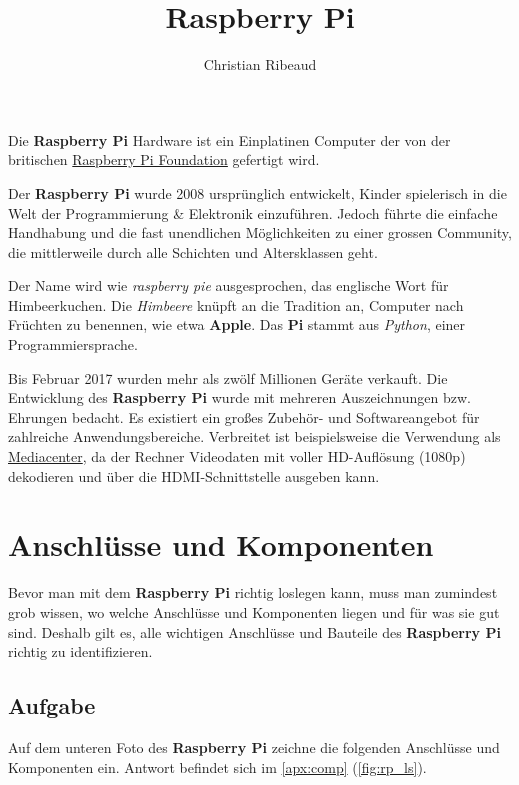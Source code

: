 \documentclass[12pt,a4paper]{article}
\newcommand{\rp}{\textbf{Raspberry Pi}\xspace}
\begin{document}
\title{Raspberry Pi}
\author{Christian Ribeaud}
\maketitle

Die \rp Hardware ist ein Einplatinen Computer der von der britischen \href{https://www.raspberrypi.org/}{Raspberry Pi Foundation} gefertigt wird.

Der \rp wurde 2008 ursprünglich entwickelt, Kinder spielerisch in die Welt der Programmierung \& Elektronik einzuführen. Jedoch führte die einfache Handhabung und die fast unendlichen Möglichkeiten zu einer grossen Community, die mittlerweile durch alle Schichten und Altersklassen geht.

Der Name wird wie \textit{raspberry pie} ausgesprochen, das englische Wort für Himbeerkuchen. Die \textit{Himbeere} knüpft an die Tradition an, Computer nach Früchten zu benennen, wie etwa \textbf{Apple}. Das \textbf{Pi} stammt aus \textit{Python}, einer Programmiersprache.

Bis Februar 2017 wurden mehr als zwölf Millionen Geräte verkauft. Die Entwicklung des \textbf{Raspberry Pi} wurde mit mehreren Auszeichnungen bzw. Ehrungen bedacht. Es existiert ein großes Zubehör- und Softwareangebot für zahlreiche Anwendungsbereiche. Verbreitet ist beispielsweise die Verwendung als \href{https://www.youtube.com/watch?v=YPu7oSVbMVo}{Mediacenter}, da der Rechner Videodaten mit voller HD-Auflösung (1080p) dekodieren und über die HDMI-Schnittstelle ausgeben kann. 

\section{Anschlüsse und Komponenten}
\label{sec:comp}

Bevor man mit dem \rp richtig loslegen kann, muss man zumindest grob wissen, wo welche Anschlüsse und Komponenten liegen und für was sie gut sind. Deshalb gilt es, alle wichtigen Anschlüsse und Bauteile des \rp richtig zu identifizieren.

\subsection{Aufgabe}

Auf dem unteren Foto des \rp zeichne die folgenden Anschlüsse und Komponenten ein. Antwort befindet sich im \cref{apx:comp} (\cref{fig:rp_ls}).
\end{document}
